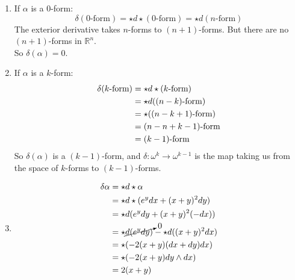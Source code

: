 \documentclass{article}
\begin{document}
\begin{enumerate}[label=(\alph*)]
    \item If $\alpha$ is a 0-form:
    $$
        \delta(0\text{-form}) = \star d \star(0\text{-form}) = \star d(n\text{-form})
    $$
    The exterior derivative takes $n$-forms to $(n+1)$-forms. But there are no $(n+1)$-forms in $\mathbb{R}^n$.\\
    So $\delta(\alpha) = 0$.

    \item If $\alpha$ is a $k$-form:
    \begin{align}
        \delta(k\text{-form}) &= \star d \star(k\text{-form}) \notag\\
            &= \star d((n-k)\text{-form}) \notag\\
            &= \star ((n-k+1)\text{-form}) \notag\\
            &= (n-n+k-1)\text{-form} \notag\\
            &= (k-1)\text{-form} \notag
    \end{align}
    So $\delta(\alpha)$ is a $(k-1)$-form, and $\delta : \omega^k \rightarrow \omega^{k-1}$ is the map taking us from the space 
    of $k$-forms to $(k-1)$-forms.

    \item 
    \begin{align}
        \delta\alpha &= \star d \star\alpha \notag\\
            &= \star d \star(e^y dx + (x + y)^2 dy) \notag\\
            &= \star d (e^y dy + (x + y)^2 (-dx)) \notag\\
            &= \star \cancelto{0}{d (e^y dy)} - \star d((x + y)^2 dx) \notag\\
            &= \star (-2(x + y)(dx + dy) dx) \notag\\
            &= \star (-2(x + y)dy \wedge dx) \notag\\
            &= 2(x + y) \notag
    \end{align}
\end{enumerate}


\vspace{1.8cm}
\\\\
\end{document}
